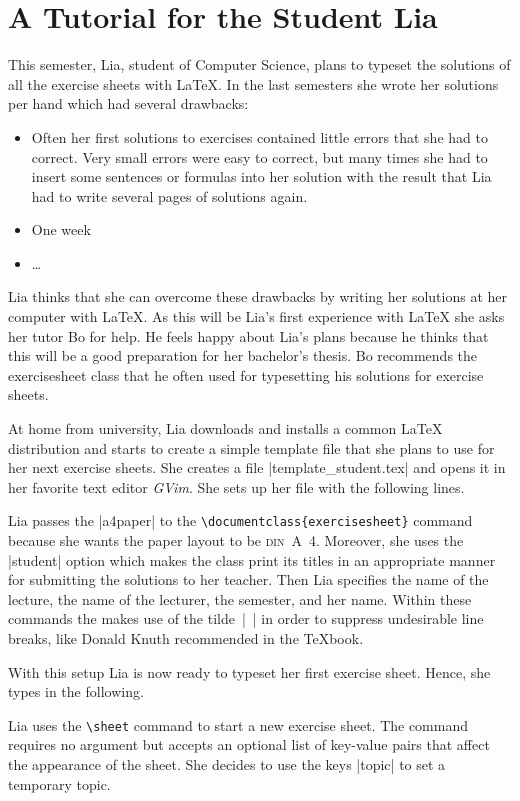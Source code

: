 \documentclass[a4paper,fleqn,9pt]{report}
\def\exercisesheet{{exercisesheet}}
\begin{document}
\section{A Tutorial for the Student Lia}

This semester, Lia, student of Computer Science, plans to typeset the
solutions of all the exercise sheets with \LaTeX{}. In the last
semesters she wrote her solutions per hand which had several
drawbacks:
\begin{itemize}
  \item Often her first solutions to exercises contained little errors
    that she had to correct. Very small errors were easy to correct,
    but many times she had to insert some sentences or formulas into
    her solution with the result that Lia had to write several pages
    of solutions again.
  \item One week 
  \item \ldots
\end{itemize}
Lia thinks that she can overcome these drawbacks by writing her
solutions at her computer with \LaTeX. As this will be Lia's first
experience with \LaTeX{} she asks her tutor Bo for help. He feels
happy about Lia's plans because he thinks that this will be a good
preparation for her bachelor's thesis. Bo recommends the
\exercisesheet{} class that he often used for typesetting his
solutions for exercise sheets.

At home from university, Lia downloads and installs a common \LaTeX{}
distribution and starts to create a simple template file that she
plans to use for her next exercise sheets. She creates a file 
|template_student.tex| and opens it in her
favorite text editor \emph{GVim}. She sets up her file with the
following lines.

Lia passes the |a4paper| to the
\lstinline|\documentclass{exercisesheet}| command because she wants
the paper layout to be \textsc{din}~A~4. Moreover, she uses the
|student| option which makes the class print its titles in
an appropriate manner for submitting the solutions to her teacher.
Then Lia specifies the name of the lecture, the name of the lecturer,
the semester, and her name. Within these commands the makes use of the
tilde~|~| in order to suppress undesirable line breaks, like
Donald Knuth recommended in the \TeX{}book.

With this setup Lia is now ready to typeset her first exercise sheet.
Hence, she types in the following.

Lia uses the \lstinline|\sheet| command to start a new exercise sheet.
The command requires no argument but accepts an optional list of
key-value pairs that affect the appearance of the sheet. She decides
to use the keys |topic| to set a temporary topic.
\end{document}

